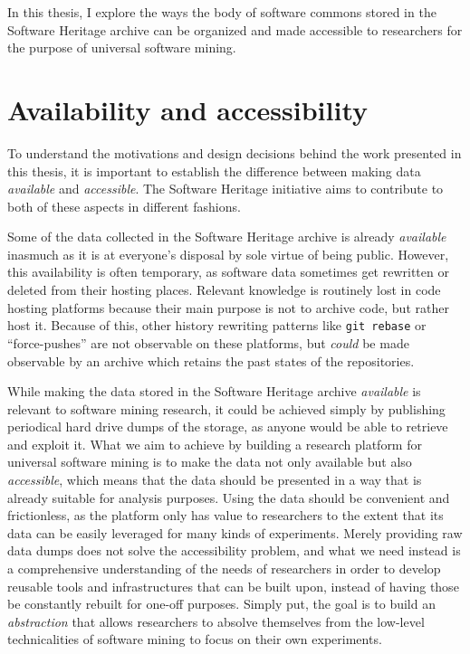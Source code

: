 In this thesis, I explore the ways the body of software commons stored in the
Software Heritage archive can be organized and made accessible to researchers
for the purpose of universal software mining.

\section{Availability and accessibility}

To understand the motivations and design decisions behind the work presented in
this thesis, it is important to establish the difference between making data
\emph{available} and \emph{accessible}.  The Software Heritage initiative aims
to contribute to both of these aspects in different fashions.

Some of the data collected in the Software Heritage archive is already
\emph{available} inasmuch as it is at everyone's disposal by sole virtue of
being public. However, this availability is often temporary, as software data
sometimes get rewritten or deleted from their hosting places. Relevant
knowledge is routinely lost in code hosting platforms because their main
purpose is not to archive code, but rather host it. Because of this, other
history rewriting patterns like \texttt{git rebase} or ``force-pushes'' are not
observable on these platforms, but \emph{could} be made observable by an
archive which retains the past states of the repositories.

While making the data stored in the Software Heritage archive \emph{available}
is relevant to software mining research, it could be achieved simply by
publishing periodical hard drive dumps of the storage, as anyone would be able
to retrieve and exploit it.
What we aim to achieve by building a research platform for universal software
mining is to make the data not only available but also \emph{accessible}, which
means that the data should be presented in a way that is already suitable for
analysis purposes. Using the data should be convenient and frictionless,
as the platform only has value to researchers to the extent that its data can
be easily leveraged for many kinds of experiments. Merely providing raw data
dumps does not solve the accessibility problem, and what we need instead is a
comprehensive understanding of the needs of researchers in order to develop
reusable tools and infrastructures that can be built upon, instead of having
those be constantly rebuilt for one-off purposes. Simply put, the goal is to
build an \emph{abstraction} that allows researchers to absolve themselves from
the low-level technicalities of software mining to focus on their own
experiments.

